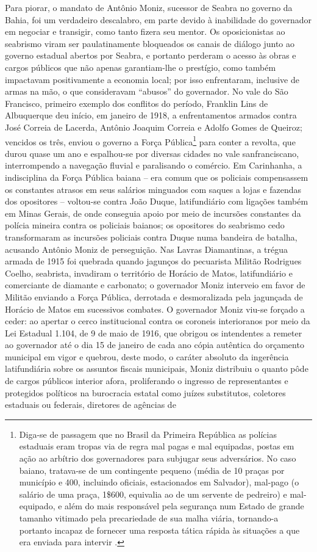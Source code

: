Para piorar, o mandato de Antônio Moniz, sucessor de Seabra no governo da Bahia, foi um verdadeiro descalabro, em parte devido à inabilidade do governador em negociar e transigir, como tanto fizera seu mentor. Os oposicionistas ao seabrismo viram ser paulatinamente bloqueados os canais de diálogo junto ao governo estadual abertos por Seabra, e portanto perderam o acesso às obras e cargos públicos que não apenas garantiam-lhe o prestígio, como também impactavam positivamente a economia local; por isso enfrentaram, inclusive de armas na mão, o que consideravam ``abusos'' do governador. No vale do São Francisco, primeiro exemplo dos conflitos do período, Franklin Lins de Albuquerque deu início, em janeiro de 1918, a enfrentamentos armados contra José Correia de Lacerda, Antônio Joaquim Correia e Adolfo Gomes de Queiroz; vencidos os três, enviou o governo a Força Pública\footnote{Diga-se de passagem que no Brasil da Primeira República as polícias estaduais eram tropas via de regra mal pagas e mal equipadas, postas em ação ao arbítrio dos governadores para subjugar seus adversários. No caso baiano, tratava-se de um contingente pequeno (média de 10 praças por município e 400, incluindo oficiais, estacionados em Salvador), mal-pago (o salário de uma praça, 1\$600, equivalia ao de um servente de pedreiro) e mal-equipado, e além do mais responsável pela segurança num Estado de grande tamanho vitimado pela precariedade de sua malha viária, tornando-a portanto incapaz de fornecer uma resposta tática rápida às situações a que era enviada para intervir \cite[pp.~46-47]{sampaio_legislativo_1985}.} para conter a revolta, que durou quase um ano e espalhou-se por diversas cidades no vale sanfranciscano, interrompendo a navegação fluvial e paralisando o comércio. Em Carinhanha, a indisciplina da Força Pública baiana -- era comum que os policiais compensassem os constantes atrasos em seus salários minguados com saques a lojas e fazendas dos opositores -- voltou-se contra João Duque, latifundiário com ligações também em Minas Gerais, de onde conseguia apoio por meio de incursões constantes da polícia mineira contra os policiais baianos; os opositores do seabrismo cedo transformaram as incursões policiais contra Duque numa bandeira de batalha, acusando Antônio Moniz de perseguição. Nas Lavras Diamantinas, a trégua armada de 1915 foi quebrada quando jagunços do pecuarista Militão Rodrigues Coelho, seabrista, invadiram o território de Horácio de Matos, latifundiário e comerciante de diamante e carbonato; o governador Moniz interveio em favor de Militão enviando a Força Pública, derrotada e desmoralizada pela jagunçada de Horácio de Matos em sucessivos combates. O governador Moniz viu-se forçado a ceder: ao apertar o cerco institucional contra os coroneis interioranos por meio da Lei Estadual 1.104, de 9 de maio de 1916, que obrigou os intendentes a remeter ao governador até o dia 15 de janeiro de cada ano cópia autêntica do orçamento municipal em vigor e quebrou, deste modo, o caráter absoluto da ingerência latifundiária sobre os assuntos fiscais municipais, Moniz distribuiu o quanto pôde de cargos públicos interior afora, proliferando o ingresso de representantes e protegidos políticos na burocracia estatal como juízes substitutos, coletores estaduais ou federais, diretores de agências de 